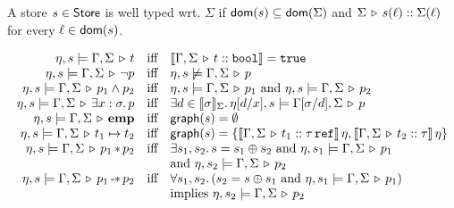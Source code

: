 \documentclass[12pt,a4paper]{article}
\newcommand{\emp}{\ensuremath{\mathbf{emp}}}
\begin{document}
A store $s\in\mathsf{Store}$ is well typed wrt. $\Sigma$ if $\mathsf{dom}(s) \subseteq \mathsf{dom}(\Sigma)$ and
$\Sigma\,\triangleright\,s(\ell)\mathrel{::}\Sigma(\ell)$ for every $\ell\in\mathsf{dom}(s)$.

\begin{definition}
  \[\begin{array}{rcl}
    \eta,s \models \Tjp{\Gamma,\Sigma}{t}
    &\text{iff}& \semantic{\Tj{\Gamma,\Sigma}{t}{\tbool}} = \true \\
    \eta,s \models \Tjp{\Gamma,\Sigma}{\neg p}
    &\text{iff}& \eta,s \not\models \Tjp{\Gamma,\Sigma}{p} \\
    \eta,s \models \Tjp{\Gamma,\Sigma}{p_1 \wedge p_2}
    &\text{iff}& \eta,s \models \Tjp{\Gamma,\Sigma}{p_1} \text{ and } \eta,s \models \Tjp{\Gamma,\Sigma}{p_2} \\
    \eta,s \models \Tjp{\Gamma,\Sigma}{\exists x:\sigma.\,p}
    &\text{iff}& \exists d \in \semantic{\sigma}_{\Sigma}.\,\eta[d/x],s \models \Tjp{\Gamma[\sigma/d],\Sigma}{p} \\
    \eta,s \models \Tjp{\Gamma,\Sigma}{\emp}
    &\text{iff}& \grph{s} = \emptyset \\
    \eta,s \models \Tjp{\Gamma,\Sigma}{t_1 \mapsto t_2}
    &\text{iff}& \grph{s} = \{\semantic{\Tj{\Gamma,\Sigma}{t_1}{\tref{\tau}}}\,\eta,\semantic{\Tj{\Gamma,\Sigma}{t_2}{\tau}}\,\eta\} \\
    \eta,s \models \Tjp{\Gamma,\Sigma}{p_1 \sepcon p_2}
    &\text{iff}& \exists s_1,s_2.\,s=s_1 \oplus s_2 \text{ and } \eta,s_1 \models \Tjp{\Gamma,\Sigma}{p_1} \\
    && \text{and } \eta,s_2 \models \Tjp{\Gamma,\Sigma}{p_2} \\
    \eta,s \models \Tjp{\Gamma,\Sigma}{p_1 \sepimp p_2}
    &\text{iff}& \forall s_1,s_2.\,(s_2 = s \oplus s_1 \text{ and } \eta,s_1 \models \Tjp{\Gamma,\Sigma}{p_1}) \\
    && \text{implies } \eta,s_2 \models \Tjp{\Gamma,\Sigma}{p_2}
  \end{array}\]
\end{definition}
\end{document}
